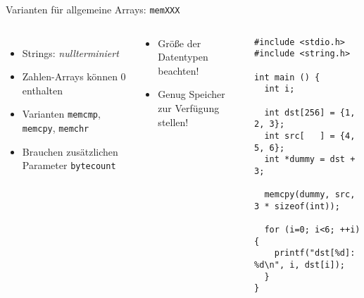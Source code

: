 \begin{frame}[fragile]{Varianten für allgemeine Arrays: \texttt{memXXX}}
%
\begin{columns}[T]
\begin{itemize}
\item Strings: \emph{nullterminiert}
\item Zahlen-Arrays können 0 enthalten
\item Varianten \texttt{memcmp}, \texttt{memcpy}, \texttt{memchr}
\item Brauchen zusätzlichen Parameter \texttt{bytecount}
\end{itemize}

\vspace{5pt}
\begin{warnbox}
\begin{itemize}
\item Größe der Datentypen beachten!
\item Genug Speicher zur Verfügung stellen!
\end{itemize}
\end{warnbox}
%
\vspace{-10pt}
\begin{codebox}
\begin{verbatim}
#include <stdio.h>
#include <string.h>

int main () {
  int i;
   
  int dst[256] = {1, 2, 3};
  int src[   ] = {4, 5, 6};
  int *dummy = dst + 3;
   
  memcpy(dummy, src, 3 * sizeof(int));
   
  for (i=0; i<6; ++i) {
    printf("dst[%d]: %d\n", i, dst[i]);
  }
}
\end{verbatim}
\end{codebox}
\end{columns}
%
\end{frame}


